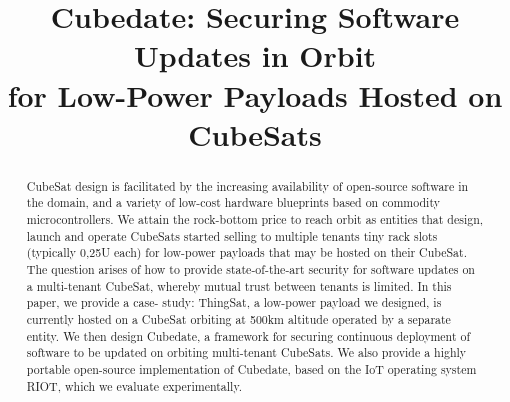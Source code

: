 \documentclass[conference]{IEEEtran}
\begin{document}

\title{Cubedate: Securing Software Updates in Orbit \\ for Low-Power Payloads Hosted on CubeSats}

\author{
\and
{}
}

\maketitle

\begin{abstract}
CubeSat design is facilitated by the increasing availability of open-source software in the domain, and a variety of low-cost
hardware blueprints based on commodity microcontrollers. We attain the rock-bottom price to reach orbit as entities that design,
launch and operate CubeSats started selling to multiple tenants tiny rack slots (typically 0,25U each) for low-power payloads
that may be hosted on their CubeSat. The question arises of how to provide state-of-the-art security for software updates on
a multi-tenant CubeSat, whereby mutual trust between tenants is limited. In this paper, we provide a case- study: ThingSat,
a low-power payload we designed, is currently hosted on a CubeSat orbiting at 500km altitude operated by a separate entity.
We then design Cubedate, a framework for securing continuous deployment of software to be updated on orbiting multi-tenant
CubeSats. We also provide a highly portable open-source implementation of Cubedate, based on the IoT operating system RIOT,
which we evaluate experimentally.
\end{abstract}

\IEEEpeerreviewmaketitle












\end{document}
